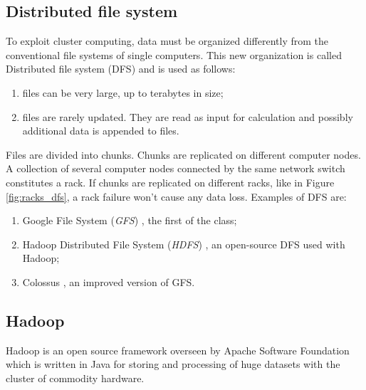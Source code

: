 \documentclass[\main/main.tex]{subfiles}
\begin{document}
\subsection{Distributed file system}
To exploit cluster computing, data must be organized differently from the conventional file systems of single computers. This new organization is called Distributed file system (DFS) and is used as follows:
\begin{enumerate}
    \item files can be very large, up to terabytes in size;
    \item files are rarely updated. They are read as input for calculation and possibly additional data is appended to files.
\end{enumerate}
Files are divided into chunks. Chunks are replicated on different computer nodes. A collection of several computer nodes connected by the same network switch constitutes a rack. If chunks are replicated on different racks, like in Figure \ref{fig:racks_dfs}, a rack failure won't cause any data loss.
Examples of DFS are:
\begin{enumerate}
    \item Google File System (\emph{GFS}) \cite{GhemawatSanjay2003TheGF}, the first of the class;
    \item Hadoop Distributed File System (\emph{HDFS}) \cite{Shvachko2010TheHD}, an open-source DFS used with Hadoop;
    \item Colossus \cite{10.1145/2491245}, an improved version of GFS.
\end{enumerate}
\subsection{Hadoop}
Hadoop is an open source framework overseen by Apache Software Foundation which is written in Java for storing and processing of huge datasets with the cluster of commodity hardware.
\end{document}
